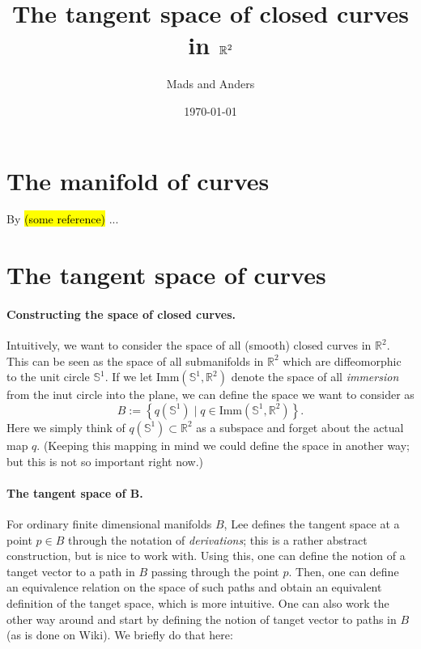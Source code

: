 \documentclass[a4,danish]{article}
\title{The tangent space of closed curves in $\R^2$}
\author{Mads and Anders}
\date{\today}
\theoremstyle{break}
\theoremstyle{definition}
\theoremstyle{Break}
\newcommand{\R}{\mathbb{R}}
\renewcommand{\S}{\mathbb{S}}
\begin{document}

\section*{The manifold of curves}
\label{sec:manifold-curves}

By \hl{(some reference)} ...

\section*{The tangent space of curves}
\label{sec:tangent-space-closed}



\paragraph{Constructing the space of closed curves.}
Intuitively, we want to consider the space of all (smooth) closed
curves in $\R^2$. This can be seen as the space of all submanifolds in
$\R^2$ which are diffeomorphic to the unit circle $\S^1$. If we let
$\text{Imm}(\S^1,\R^2)$ denote the space of all \textit{immersion}
from the inut circle into the plane, we can define the space we
want to consider as
\begin{equation}
  \label{eq:curves}
  B :=
  \left\{
    q(\S^1) \mid q \in \text{Imm}(\S^1,\R^2)
  \right\}.
\end{equation}
Here we simply think of $q(\S^1) \subset \R^2$ as a subspace and forget
about the actual map $q$. (Keeping this mapping in mind we could
define the space in another way; but this is not so important right
now.)

\paragraph{The tangent space of B.}
For ordinary finite dimensional manifolds $B$, Lee defines the tangent
space at a point $p \in B$ through the notation of
\textit{derivations}; this is a rather abstract construction, but is
nice to work with. Using this, one can define the notion of a
tanget vector to a path in $B$ passing through the point $p$. Then,
one can define an equivalence relation on the space of such paths and
obtain an equivalent definition of the tanget space, which is more
intuitive. One can also work the other way around and start by
defining the notion of tanget vector to paths in $B$ (as is done on
Wiki). We briefly do that here:
\end{document}
